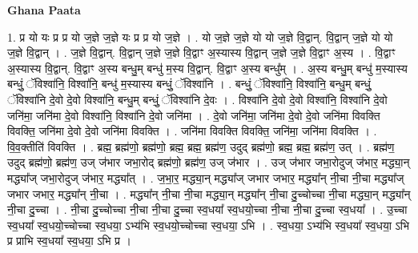 \documentclass[17pt]{extarticle}
\begin{document}
\textbf{Ghana Paata } \newline

1. प्र यो यः प्र प्र यो ज॒ज्ञे ज॒ज्ञे यः प्र प्र यो ज॒ज्ञे । . यो ज॒ज्ञे ज॒ज्ञे यो यो ज॒ज्ञे वि॒द्वान्. वि॒द्वान् ज॒ज्ञे यो यो ज॒ज्ञे वि॒द्वान् । . ज॒ज्ञे वि॒द्वान्. वि॒द्वान् ज॒ज्ञे ज॒ज्ञे वि॒द्वाꣳ अ॒स्यास्य वि॒द्वान् ज॒ज्ञे ज॒ज्ञे वि॒द्वाꣳ अ॒स्य । . वि॒द्वाꣳ अ॒स्यास्य वि॒द्वान्. वि॒द्वाꣳ अ॒स्य बन्धु॒म् बन्धु॑ म॒स्य वि॒द्वान्. वि॒द्वाꣳ अ॒स्य बन्धु᳚म् । . अ॒स्य बन्धु॒म् बन्धु॑ म॒स्यास्य बन्धुं॒ ॅविश्वा॑नि॒ विश्वा॑नि॒ बन्धु॑ म॒स्यास्य बन्धुं॒ ॅविश्वा॑नि । . बन्धुं॒ ॅविश्वा॑नि॒ विश्वा॑नि॒ बन्धु॒म् बन्धुं॒ ॅविश्वा॑नि दे॒वो दे॒वो विश्वा॑नि॒ बन्धु॒म् बन्धुं॒ ॅविश्वा॑नि दे॒वः । . विश्वा॑नि दे॒वो दे॒वो विश्वा॑नि॒ विश्वा॑नि दे॒वो जनि॑मा॒ जनि॑मा दे॒वो विश्वा॑नि॒ विश्वा॑नि दे॒वो जनि॑मा । . दे॒वो जनि॑मा॒ जनि॑मा दे॒वो दे॒वो जनि॑मा विवक्ति विवक्ति॒ जनि॑मा दे॒वो दे॒वो जनि॑मा विवक्ति । . जनि॑मा विवक्ति विवक्ति॒ जनि॑मा॒ जनि॑मा विवक्ति । . वि॒व॒क्तीति॑ विवक्ति । . ब्रह्म॒ ब्रह्म॑णो॒ ब्रह्म॑णो॒ ब्रह्म॒ ब्रह्म॒ ब्रह्म॑ण॒ उदुद् ब्रह्म॑णो॒ ब्रह्म॒ ब्रह्म॒ ब्रह्म॑ण॒ उत् । . ब्रह्म॑ण॒ उदुद् ब्रह्म॑णो॒ ब्रह्म॑ण॒ उज् ज॑भार जभा॒रोद् ब्रह्म॑णो॒ ब्रह्म॑ण॒ उज् ज॑भार । . उज् ज॑भार जभा॒रोदुज् ज॑भार॒ मद्ध्या॒न् मद्ध्या᳚ज् जभा॒रोदुज् ज॑भार॒ मद्ध्या᳚त् । . ज॒भा॒र॒ मद्ध्या॒न् मद्ध्या᳚ज् जभार जभार॒ मद्ध्या᳚न् नी॒चा नी॒चा मद्ध्या᳚ज् जभार जभार॒ मद्ध्या᳚न् नी॒चा । . मद्ध्या᳚न् नी॒चा नी॒चा मद्ध्या॒न् मद्ध्या᳚न् नी॒चा दु॒च्चोच्चा नी॒चा मद्ध्या॒न् मद्ध्या᳚न् नी॒चा दु॒च्चा । . नी॒चा दु॒च्चोच्चा नी॒चा नी॒चा दु॒च्चा स्व॒धया᳚ स्व॒धयो॒च्चा नी॒चा नी॒चा दु॒च्चा स्व॒धया᳚ । . उ॒च्चा स्व॒धया᳚ स्व॒धयो॒च्चोच्चा स्व॒धया॒ ऽभ्य॑भि स्व॒धयो॒च्चोच्चा स्व॒धया॒ ऽभि । . स्व॒धया॒ ऽभ्य॑भि स्व॒धया᳚ स्व॒धया॒ ऽभि प्र प्राभि स्व॒धया᳚ स्व॒धया॒ ऽभि प्र । \newline
\end{document}
